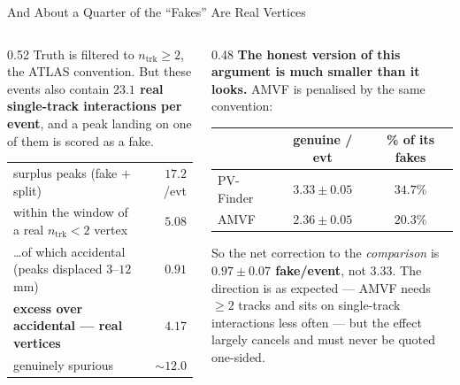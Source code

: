 \documentclass[xcolor=table,aspectratio=169]{beamer}
\newcommand{\ntrk}{\ensuremath{n_\mathrm{trk}}}
\begin{document}
\begin{frame}{And About a Quarter of the ``Fakes'' Are Real Vertices}
    \begin{columns}[t]
        \begin{column}{0.52\linewidth}
            \small
            Truth is filtered to $\ntrk\geq2$, the ATLAS convention. But these events
            also contain \textbf{$23.1$ real single-track interactions per event}, and
            a peak landing on one of them is scored as a fake.
            \vspace{0.3em}
            \centering
            \footnotesize
            \begin{tabular}{lr}
                \toprule
                surplus peaks (fake $+$ split) & $17.2$/evt \\
                within the window of a real $\ntrk\!<\!2$ vertex & $5.08$ \\
                \dots of which accidental (peaks displaced $3$--$12$\,mm) & $0.91$ \\
                \midrule
                \textbf{excess over accidental --- real vertices} & $\mathbf{4.17}$ \\
                genuinely spurious & ${\sim}12.0$ \\
                \bottomrule
            \end{tabular}
        \end{column}
        \begin{column}{0.48\linewidth}
            \small
            \textbf{The honest version of this argument is much smaller than it
            looks.} AMVF is penalised by the same convention:
            \vspace{0.3em}
            \centering
            \footnotesize
            \begin{tabular}{lcc}
                \toprule
                & genuine / evt & \% of its fakes \\
                \midrule
                PV-Finder & $3.33 \pm 0.05$ & $34.7\%$ \\
                AMVF      & $2.36 \pm 0.05$ & $20.3\%$ \\
                \bottomrule
            \end{tabular}
            \vspace{0.4em}
            \raggedright

            So the net correction to the \emph{comparison} is
            \textbf{$0.97 \pm 0.07$ fake/event}, not $3.33$. The direction is as
            expected --- AMVF needs $\geq2$ tracks and sits on single-track
            interactions less often --- but the effect largely cancels and must never
            be quoted one-sided.
        \end{column}
    \end{columns}
\end{frame}
\end{document}
